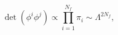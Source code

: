 \begin{equation}
\label{Eq:InstantonScalar}
\det (\phi^i\phi^j) \propto \prod_{i=1}^{N_f}\pi_i \sim \Lambda^{2N_f},
\end{equation}

